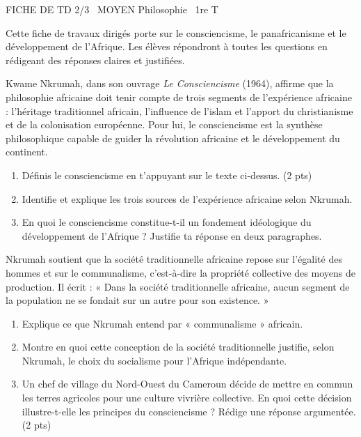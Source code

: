 \documentclass[11pt]{article}
\begin{document}
\begin{tcolorbox}[enhanced,colback=popink,colframe=popink,arc=10pt,boxrule=0pt,left=12pt,right=12pt,top=9pt,bottom=9pt]
{\color{white}\popxbold\small FICHE DE TD 2/3 \textbullet\ MOYEN \hfill Philosophie \textbullet\ 1re T\par}
\end{tcolorbox}
\vspace{4pt}
Cette fiche de travaux dirigés porte sur le consciencisme, le panafricanisme et le développement de l'Afrique. Les élèves répondront à toutes les questions en rédigeant des réponses claires et justifiées.

\begin{exercice}
Kwame Nkrumah, dans son ouvrage \textit{Le Consciencisme} (1964), affirme que la philosophie africaine doit tenir compte de trois segments de l'expérience africaine : l'héritage traditionnel africain, l'influence de l'islam et l'apport du christianisme et de la colonisation européenne. Pour lui, le consciencisme est la synthèse philosophique capable de guider la révolution africaine et le développement du continent.
\begin{enumerate}
\item Définis le consciencisme en t'appuyant sur le texte ci-dessus. (2 pts)
\item Identifie et explique les trois sources de l'expérience africaine selon Nkrumah.
\item En quoi le consciencisme constitue-t-il un fondement idéologique du développement de l'Afrique ? Justifie ta réponse en deux paragraphes.
\end{enumerate}
\end{exercice}

\begin{exercice}
Nkrumah soutient que la société traditionnelle africaine repose sur l'égalité des hommes et sur le communalisme, c'est-à-dire la propriété collective des moyens de production. Il écrit : « Dans la société traditionnelle africaine, aucun segment de la population ne se fondait sur un autre pour son existence. »
\begin{enumerate}
\item Explique ce que Nkrumah entend par « communalisme » africain.
\item Montre en quoi cette conception de la société traditionnelle justifie, selon Nkrumah, le choix du socialisme pour l'Afrique indépendante.
\item Un chef de village du Nord-Ouest du Cameroun décide de mettre en commun les terres agricoles pour une culture vivrière collective. En quoi cette décision illustre-t-elle les principes du consciencisme ? Rédige une réponse argumentée. (2 pts)
\end{enumerate}
\end{exercice}
\end{document}
